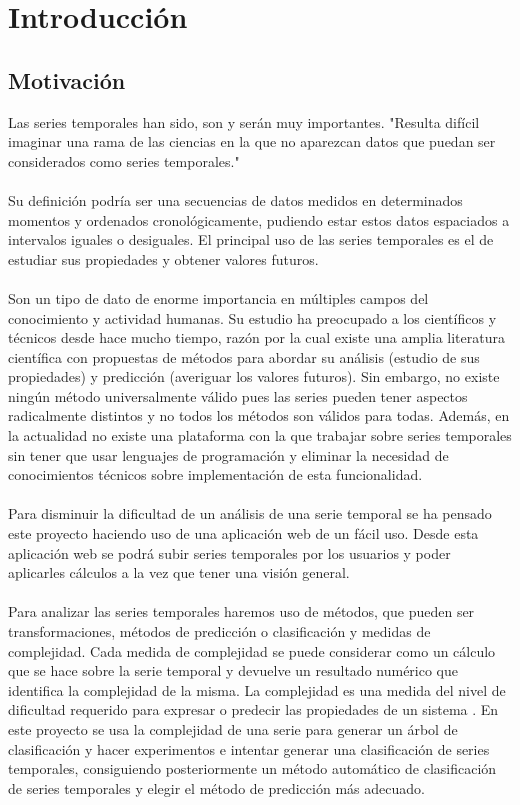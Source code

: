 \documentclass[14pt]{extarticle}
\theoremstyle{definition}
\theoremstyle{remark}
\begin{document}
\section{Introducción}\label{sec:introduccion}
\subsection{Motivación}\label{sec:motivacion}
Las series temporales han sido, son y serán muy importantes. "Resulta difícil imaginar una rama de las ciencias en la que no aparezcan datos que puedan ser considerados como series temporales." \cite{wiki:serie_temporal}\\\\
Su definición podría ser una secuencias de datos medidos en determinados momentos y ordenados cronológicamente, pudiendo estar estos datos espaciados a intervalos iguales o desiguales. El principal uso de las series temporales es el de estudiar sus propiedades y obtener valores futuros.\\\\
Son un tipo de dato de enorme importancia en múltiples campos del conocimiento y actividad humanas. Su estudio ha preocupado a los científicos y técnicos desde hace mucho tiempo, razón por la cual existe una amplia literatura científica con propuestas de métodos para abordar su análisis (estudio de sus propiedades) y predicción (averiguar los valores futuros). Sin embargo, no existe ningún método universalmente válido pues las series pueden tener aspectos radicalmente distintos y no todos los métodos son válidos para todas. Además, en la actualidad no existe una plataforma con la que trabajar sobre series temporales sin tener que usar lenguajes de programación y eliminar la necesidad de conocimientos técnicos sobre implementación de esta funcionalidad. \\\\
Para disminuir la dificultad de un análisis de una serie temporal se ha pensado este proyecto haciendo uso de una aplicación web de un fácil uso. Desde esta aplicación web se podrá subir series temporales por los usuarios y poder aplicarles cálculos a la vez que tener una visión general.\\\\
Para analizar las series temporales haremos uso de métodos, que pueden ser transformaciones, métodos de predicción o clasificación y medidas de complejidad. Cada medida de complejidad se puede considerar como un cálculo que se hace sobre la serie temporal y devuelve un resultado numérico que identifica la complejidad de la misma. La complejidad es una medida del nivel de dificultad requerido para expresar o predecir las propiedades de un sistema \cite{article:complejidad}. En este proyecto se usa la complejidad de una serie para generar un árbol de clasificación y hacer experimentos e intentar generar una clasificación de series temporales, consiguiendo posteriormente un método automático de clasificación de series temporales y elegir el método de predicción más adecuado. \\\\
\end{document}
